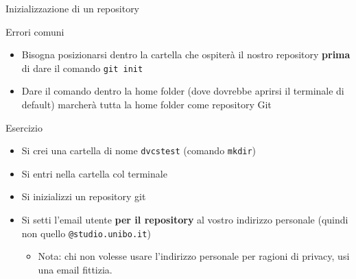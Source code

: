 \documentclass[presentation]{beamer}
\begin{document}
\begin{frame}[allowframebreaks]{Inizializzazione di un repository}
	\begin{block}{Errori comuni}
		\begin{itemize}
			\item Bisogna posizionarsi dentro la cartella che ospiterà il nostro repository \textbf{prima} di dare il comando \texttt{git init}
			\item Dare il comando dentro la home folder (dove dovrebbe aprirsi il terminale di default) marcherà tutta la home folder come repository Git
		\end{itemize}
	\end{block}
	\begin{block}{Esercizio}
		\begin{itemize}
			\item Si crei una cartella di nome \texttt{dvcstest} (comando \texttt{mkdir})
			\item Si entri nella cartella col terminale
			\item Si inizializzi un repository git
			\item Si setti l'email utente \textbf{per il repository} al vostro indirizzo personale (quindi non quello \texttt{@studio.unibo.it})
			\begin{itemize}
				\item Nota: chi non volesse usare l'indirizzo personale per ragioni di privacy, usi una email fittizia.
			\end{itemize}
		\end{itemize}
	\end{block}
\end{frame}
\end{document}
